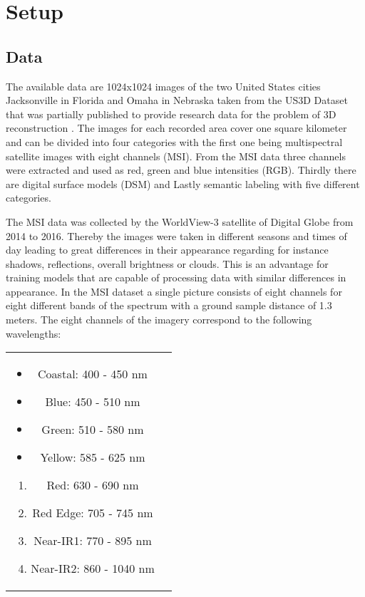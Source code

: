 \section{Setup}

\subsection{Data}

The available data are 1024x1024 images of the two United States cities Jacksonville
in Florida and Omaha in Nebraska taken from the US3D Dataset that
was partially published to provide research data for the problem
of 3D reconstruction \parencite{2019-bosch-semantic}.
The images for each recorded area cover one square kilometer and can be divided 
into four categories with the first one being multispectral satellite images with eight channels (MSI). 
From the MSI data three channels were extracted and used as red, green and blue intensities (RGB). 
Thirdly there are digital surface models (DSM) and Lastly semantic labeling with five different categories.
\medskip

The MSI data was collected by the WorldView-3 satellite of Digital Globe from 2014 to 2016.
Thereby the images were taken in different seasons and times of day leading to great differences
in their appearance regarding for instance shadows, reflections, overall brightness or clouds.
This is an advantage for training models that are capable of processing data with similar differences in 
appearance.
In the MSI dataset a single picture consists of eight channels for eight different bands of the spectrum with
a ground sample distance of 1.3 meters. The eight channels of the imagery correspond to the following wavelengths:

\begin{tabular} {c c}
    \parbox{5cm}{
        \begin{itemize}
            \item Coastal: 400 - 450 nm 			
            \item Blue: 450 - 510 nm			
            \item Green: 510 - 580 nm 			
            \item Yellow: 585 - 625 nm
        \end{itemize}
    }
    \parbox{5cm}{
        \begin{enumerate} 			
            \item Red: 630 - 690 nm
            \item Red Edge: 705 - 745 nm
            \item Near-IR1: 770 - 895 nm
            \item Near-IR2: 860 - 1040 nm
        \end{enumerate}
    }
\end{tabular}
\bigskip

